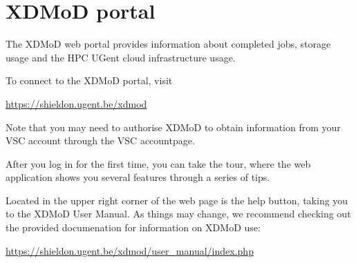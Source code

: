 \chapter{XDMoD portal}
\label{ch:xdmod}

The XDMoD web portal provides information about completed jobs, storage usage and
the HPC UGent cloud infrastructure usage.

To connect to the XDMoD portal, visit

\begin{center}\url{https://shieldon.ugent.be/xdmod}\end{center}

Note that you may need to authorise XDMoD to obtain information from your VSC
account through the VSC accountpage.

After you log in for the first time, you can take the tour, where the web
application shows you several features through a series of tips.

Located in the upper right corner of the web page is the help button, taking
you to the XDMoD User Manual. As things may change, we recommend checking out
the provided documenation for information on XDMoD use:

\begin{center}\url{https://shieldon.ugent.be/xdmod/user_manual/index.php}\end{center}


